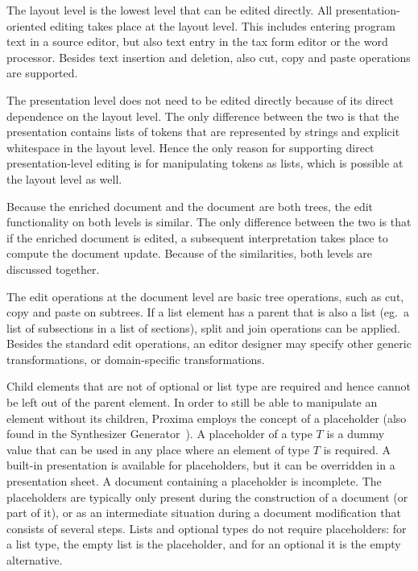 
The layout level is the lowest level that can be edited directly. All presentation-oriented editing takes place at the layout level. This includes entering program text in a source editor, but also text entry in the tax form editor or the word processor. Besides text insertion and deletion, also cut, copy and paste operations are supported.


The presentation level does not need to be edited directly because of its direct dependence on the layout level. The only difference between the two is that the presentation contains lists of tokens that are represented by strings and explicit whitespace in the layout level. Hence the only reason for supporting direct presentation-level editing is for manipulating tokens as lists, which is possible at the layout level as well.


Because the enriched document and the document are both trees, the edit functionality on both levels is similar. The only difference between the two is that if the enriched document is edited, a subsequent interpretation takes place to compute the document update. Because of the similarities, both levels are discussed together.

The edit operations at the document level are basic tree operations, such as cut, copy and paste on subtrees. If a list element has a parent that is also a list (eg.\ a list of subsections in a list of sections), split and join operations can be applied. Besides the standard edit operations, an editor designer may specify other generic transformations, or domain-specific transformations.

Child elements that are not of optional or list type are required and hence cannot be left out of the parent element. In order to still be able to manipulate an element without its children, Proxima employs the concept of a placeholder (also found in the Synthesizer Generator~\cite{reps84synGen}). A placeholder of a type $T$ is a dummy value that can be used in any place where an element of type $T$ is required. A built-in presentation is available for placeholders, but it can be overridden in a presentation sheet. A document containing a placeholder is incomplete. The placeholders are typically only present during the construction of a document (or part of it), or as an intermediate situation during a document modification that consists of several steps. Lists and optional types do not require placeholders: for a list type, the empty list is the placeholder, and for an optional it is the empty alternative.

